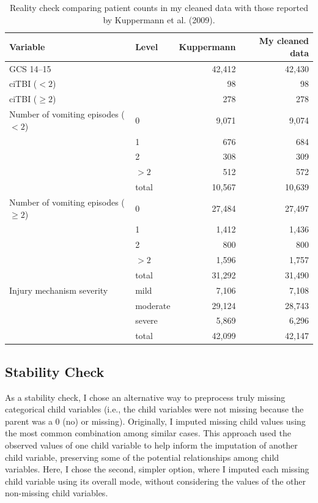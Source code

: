 \documentclass[11pt,letterpaper]{article}
\begin{document}
\begin{table}[H]
    \centering
    \caption{Reality check comparing patient counts in my cleaned data with those reported by Kuppermann et al. (2009).}
    \begin{tabular}{llrr}
        \toprule
        Variable & Level & Kuppermann & My cleaned data \\
        \midrule
        GCS 14--15 & & 42,412 & 42,430 \\
        ciTBI ($<2$) & & 98 & 98 \\
        ciTBI ($\geq2$) & & 278 & 278 \\
        \midrule
        Number of vomiting episodes ($<2$) & 0 & 9,071 & 9,074 \\
        & 1 & 676 & 684 \\
        & 2 & 308 & 309 \\
        & $>2$ & 512 & 572 \\
        & total & 10,567 & 10,639 \\
        \midrule
        Number of vomiting episodes ($\geq2$) & 0 & 27,484 & 27,497 \\
        & 1 & 1,412 & 1,436 \\
        & 2 & 800 & 800 \\
        & $>2$ & 1,596 & 1,757 \\
        & total & 31,292 & 31,490 \\
        \midrule
        Injury mechanism severity & mild & 7,106 & 7,108 \\
        & moderate & 29,124 & 28,743 \\
        & severe & 5,869 & 6,296 \\
        & total & 42,099 & 42,147 \\
        \bottomrule
    \end{tabular}
\end{table}

\subsection{Stability Check}\label{stability-check}

As a stability check, I chose an alternative way to preprocess truly missing categorical child variables
(i.e., the child variables were not missing because the parent was a 0 (no) or missing).
Originally, I imputed missing child values using the most common combination among
similar cases. This approach used the observed values of one child variable to help
inform the imputation of another child variable, preserving some of the potential relationships
among child variables. Here, I chose the second, simpler option, where I imputed each missing
child variable using its overall mode, without considering the values of the other non-missing child variables. 
\end{document}
